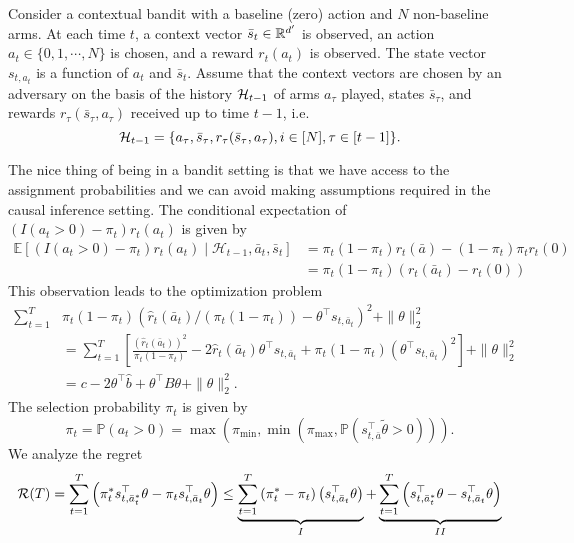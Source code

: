 \documentclass[letterpaper,11pt]{article}
\begin{document}
Consider a contextual bandit with a baseline (zero) action and $N$ non-baseline arms. At each time $t$, a context vector $\bar{s}_t \in \mathbb{R}^{d'}$ is observed, an action $a_t \in \{0,1,\cdots, N\}$ is chosen, and a reward $r_t(a_t)$ is observed. The state vector $s_{t,a_t}$ is a function of $a_t$ and $\bar{s}_t$. Assume that the context vectors are chosen by an adversary on the basis of the history $\mathcal{H}_{t-1}$ of arms $a_\tau$ played, states $\bar{s}_{\tau}$, and rewards $r_\tau(\bar{s}_{\tau}, a_\tau)$ received up to time $t-1$, i.e.
\begin{equation*}
    \mathcal{H}_{t-1} = \{a_\tau, \bar{s}_\tau, r_\tau(\bar{s}_\tau, a_\tau), i\in[N], \tau \in [t-1]\}. 
\end{equation*}

The nice thing of being in a bandit setting is that we have access to the assignment probabilities and we can avoid making assumptions required in the causal inference setting. 
The conditional expectation of $\left(I\left(a_t>0\right)-\pi_t\right) r_t\left(a_t\right)$ is given by
\begin{equation*}
    \begin{aligned}
\mathbb{E}\left[\left(I\left(a_t>0\right)-\pi_t\right) r_t\left(a_t\right) \mid \mathcal{H}_{t-1}, \bar{a}_t, \bar{s}_t\right] & =\pi_t\left(1-\pi_t\right) r_t(\bar{a})-\left(1-\pi_t\right) \pi_t r_t(0) \\
& =\pi_t\left(1-\pi_t\right)\left(r_t\left(\bar{a}_t\right)-r_t(0)\right)
\end{aligned}
\end{equation*}
This observation leads to the optimization problem
\begin{equation*}
\begin{aligned}
\sum_{t=1}^T & \pi_t\left(1-\pi_t\right)\left(\hat{r}_t\left(\bar{a}_t\right) /\left(\pi_t\left(1-\pi_t\right)\right)-\theta^\top s_{t, \bar{a}_t}\right)^2+\|\theta\|_2^2 \\
& =\sum_{t=1}^T \left[\frac{\left(\hat{r}_t\left(\bar{a}_t\right)\right)^2}{\pi_t\left(1-\pi_t\right)}-2 \hat{r}_t\left(\bar{a}_t\right) \theta^\top s_{t, \bar{a}_t}+\pi_t\left(1-\pi_t\right)\left(\theta^\top s_{t, \bar{a}_t}\right)^2\right] + \|\theta\|_2^2 \\
& =c-2 \theta^\top \hat{b}+\theta^\top B \theta+\|\theta\|_2^2.
\end{aligned}
\end{equation*}
The selection probability $\pi_t$ is given by
\begin{equation*}
    \pi_t=\mathbb{P}\left(a_t>0\right)=\max \left(\pi_{\min }, \min \left(\pi_{\max }, \mathbb{P}\left(s_{t, \bar{a}}^\top \tilde{\theta}>0\right)\right)\right).
\end{equation*}
We analyze the regret 
\begin{equation*}
    \mathcal{R}(T) = \sum_{t=1}^T \left(\pi_t^* s_{t, \bar{a}_t^*}^\top \theta-\pi_t s_{t, \bar{a}_t}^\top \theta\right) \leq \underbrace{\sum_{t=1}^T\left(\pi_t^*-\pi_t\right)\left(s_{t, \bar{a}_t}^\top \theta\right)}_I+\underbrace{\sum_{t=1}^T\left(s_{t, \bar{a}_t^*}^\top \theta-s_{t, \bar{a}_t}^\top \theta\right)}_{II}
\end{equation*}
\end{document}
